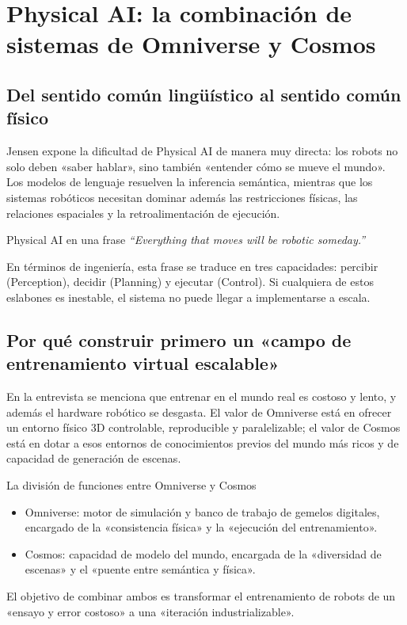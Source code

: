 \section{Physical AI: la combinación de sistemas de Omniverse y Cosmos}

\subsection{Del sentido común lingüístico al sentido común físico}

Jensen expone la dificultad de Physical AI de manera muy directa: los robots no solo deben «saber hablar», sino también «entender cómo se mueve el mundo». Los modelos de lenguaje resuelven la inferencia semántica, mientras que los sistemas robóticos necesitan dominar además las restricciones físicas, las relaciones espaciales y la retroalimentación de ejecución.

\begin{importantbox}{Physical AI en una frase}
\textit{``Everything that moves will be robotic someday.''}

En términos de ingeniería, esta frase se traduce en tres capacidades: percibir (Perception), decidir (Planning) y ejecutar (Control). Si cualquiera de estos eslabones es inestable, el sistema no puede llegar a implementarse a escala.
\end{importantbox}

\subsection{Por qué construir primero un «campo de entrenamiento virtual escalable»}

En la entrevista se menciona que entrenar en el mundo real es costoso y lento, y además el hardware robótico se desgasta. El valor de Omniverse está en ofrecer un entorno físico 3D controlable, reproducible y paralelizable; el valor de Cosmos está en dotar a esos entornos de conocimientos previos del mundo más ricos y de capacidad de generación de escenas.

\begin{knowledgebox}{La división de funciones entre Omniverse y Cosmos}
\begin{itemize}
    \item Omniverse: motor de simulación y banco de trabajo de gemelos digitales, encargado de la «consistencia física» y la «ejecución del entrenamiento».
    \item Cosmos: capacidad de modelo del mundo, encargada de la «diversidad de escenas» y el «puente entre semántica y física».
\end{itemize}
El objetivo de combinar ambos es transformar el entrenamiento de robots de un «ensayo y error costoso» a una «iteración industrializable».
\end{knowledgebox}

